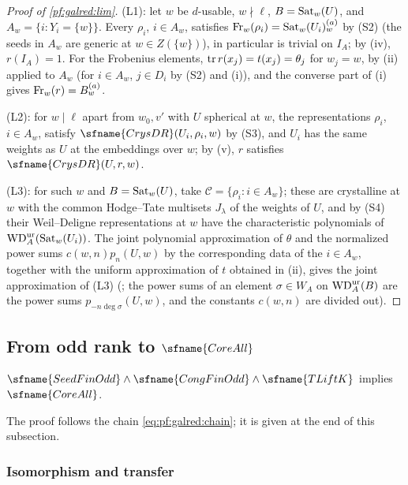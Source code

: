 \begin{proof}[Proof of \cref{pf:galred:lim}]
(L1): let $w$ be $d$-usable, $w\nmid\ell$, $B=\operatorname{Sat}_w(U)$, and $A_w=\{i:Y_i=\{w\}\}$. Every $\rho_i$, $i\in A_w$, satisfies
$\operatorname{Fr}_w(\rho_i)=\operatorname{Sat}_w(U_i)^{(a)}_w$ by (S2) (the seeds in $A_w$ are generic at $w\in Z(\{w\})$), in particular is trivial on
$I_A$; by (iv), $r(I_A)=1$. For the Frobenius elements, $\operatorname{tr} r(x_j)=t(x_j)=\theta_j$ for $w_j=w$, by (ii) applied to $A_w$
(for $i\in A_w$, $j\in D_i$ by (S2) and (i)), and the converse part of (i) gives $\operatorname{Fr}_w(r)=B^{(a)}_w$.

(L2): for $w\mid\ell$ apart from $w_0,v'$ with $U$ spherical at $w$, the representations $\rho_i$, $i\in A_w$, satisfy
$\sfname{CrysDR}(U_i,\rho_i,w)$ by (S3), and $U_i$ has the same weights as $U$ at the embeddings over $w$; by (v), $r$
satisfies $\sfname{CrysDR}(U,r,w)$.

(L3): for such $w$ and $B=\operatorname{Sat}_w(U)$, take $\mathcal C=\{\rho_i:i\in A_w\}$; these are crystalline at $w$ with the common
Hodge--Tate multisets $J_{\lambda}$ of the weights of $U$, and by (S4) their Weil--Deligne representations at $w$ have the
characteristic polynomials of $\mathrm{WD}^{\mathrm{ur}}_A(\operatorname{Sat}_w(U_i))$. The joint polynomial approximation of $\theta$ and the normalized
power sums $c(w,n)p_n(U,w)$ by the corresponding data of the $i\in A_w$, together with the uniform approximation of $t$
obtained in (ii), gives the joint approximation of (L3) (; the power sums of an element
$\sigma\in W_A$ on $\mathrm{WD}^{\mathrm{ur}}_A(B)$ are the power sums $p_{-n\deg\sigma}(U,w)$, and the constants $c(w,n)$ are divided out).
\end{proof}

\subsection{From odd rank to \texorpdfstring{$\sfname{CoreAll}$}{CoreAll}}\label{sec:pf:galred:core}

\begin{theorem}\label{pf:galred:coreallof}
$\sfname{SeedFinOdd}\wedge\sfname{CongFinOdd}\wedge\sfname{TLiftK}$ implies $\sfname{CoreAll}$.
\end{theorem}

The proof follows the chain \eqref{eq:pf:galred:chain}; it is given at the end of this subsection.

\subsubsection{Isomorphism and transfer}

